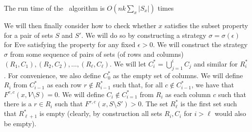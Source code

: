 \begin{lemma}
The run time of the \crgLim\ algorithm is $O(nk\sum_{x} |S_x|)$ times 
\end{lemma}

We will then finally consider how to check whether $x$ satisfies the subset property for a pair of sets $S$ and $S'$.
We will do so by constructing a strategy $\sigma=\sigma(\epsilon)$ for Eve satisfying the property for any fixed $\epsilon>0$.
We will construct the strategy  $\sigma$ from some sequence of pairs of sets (of rows and columns) $(R_1,C_1),(R_2,C_2),\dots,(R_{\ell},C_{\ell})$. We will let $C_i^*=\bigcup_{j=1}^i C_j$ and similar for $R^*_i$.
For convenience, we also define $C_0^*$ as the empty set of columns.
We will define $R_i$ from $C_{i-1}^*$ as each row $r\not\in R_{i-1}^*$ such that, for all $c\not\in C^*_{i-1}$, we have that $F^{r,c}(x,V\setminus S)=0$.
We will define $C_i\not\in C_{i=1}^*$ from $R_i$ as each column $c$ such that there is a $r\in R_i$ such that 
$F^{r,c}(x,S\setminus S')>0$.
The set $R^{*}_{\ell}$ is the first set such that $R^*_{\ell+1}$ is empty (clearly, by construction all sets $R_i,C_i$ for $i>\ell$ would also be empty).

